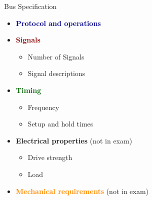 \begin{concept}{Bus Specification}
    \begin{itemize}
        \item \textcolor{darkblue}{\textbf{Protocol and operations}}
        \item \textcolor{darkred}{\textbf{Signals}}
        \begin{itemize}
            \item Number of Signals
            \item Signal descriptions
        \end{itemize}
        \item \textcolor{darkgreen}{\textbf{Timing}}
        \begin{itemize}
            \item Frequency
            \item Setup and hold times
        \end{itemize}
        \item \textcolor{darkpurple}{\textbf{Electrical properties}} (not in exam)
        \begin{itemize}
            \item Drive strength
            \item Load
        \end{itemize}
        \item \textcolor{darkorange}{\textbf{Mechanical requirements}} (not in exam)
    \end{itemize}
\end{concept}

